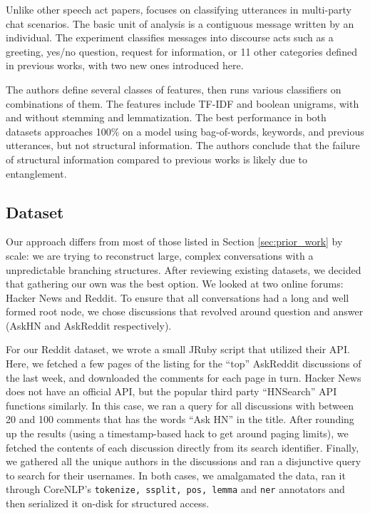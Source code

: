 \documentclass{article}
\begin{document}
Unlike other speech act papers, \cite{Kim2012} 
focuses on classifying utterances
in multi-party chat scenarios. The basic unit
of analysis is a contiguous message written by an individual. The
experiment classifies messages into discourse acts such as a greeting, yes/no
question, request for information, or 11 other categories defined in previous
works, with two new ones introduced here.

The authors define several classes of features, then runs various classifiers on
combinations of them. The features include TF-IDF and boolean unigrams, with
and without stemming and lemmatization.  The best
performance in both datasets approaches 100\% on a model using bag-of-words,
keywords, and previous utterances, but not structural information. 
The authors conclude that the failure of structural information 
compared to previous works is likely due to entanglement.

\subsection{Dataset}
\label{sec:dataset}
Our approach differs from most of those listed in Section \ref{sec:prior_work}
by scale: we are trying to reconstruct large, complex
conversations with a unpredictable branching structures. After reviewing existing datasets,
we decided that gathering our own was the best option. We looked at two
online forums: Hacker News and Reddit. To ensure that all conversations had a long
and well formed root node, we chose discussions that revolved around question and answer 
(AskHN and AskReddit respectively). 

For our Reddit dataset, we wrote a small JRuby script that utilized their API. Here,
we fetched a few pages of the listing for the ``top'' AskReddit discussions of the last
week, and downloaded the comments for each page in turn. Hacker News does not have
an official API, but the popular third party ``HNSearch'' API functions similarly.
In this case, we ran a query for all discussions with between 20 and 100 comments
that has the words ``Ask HN'' in the title. After rounding up the results (using
a timestamp-based hack to get around paging limits), we fetched the contents of
each discussion directly from its search identifier. Finally, we gathered all
the unique authors in the discussions and ran a disjunctive query to search for
their usernames. In both cases, we amalgamated the data, ran it through
CoreNLP's \texttt{tokenize, ssplit, pos, lemma} and \texttt{ner} annotators and
then serialized it on-disk for structured access.
\end{document}

